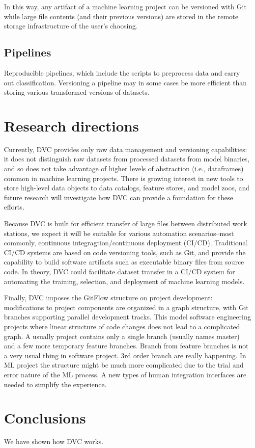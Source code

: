 \documentclass[10pt,sigconf, authordraft]{acmart}
\begin{document}
In this way, any artifact of a machine learning project can be versioned with Git while large file contents (and their previous versions) are stored in the remote storage infrastructure of the user's choosing. 

\subsection{Pipelines}


Reproducible pipelines, which include the scripts to preprocess data and carry out classification. Versioning a pipeline may in some cases be more efficient than storing various transformed versions of datasets. 


\section{Research directions}
Currently, DVC provides only raw data management and versioning capabilities: it does not distinguish raw datasets from processed datasets from model binaries, and so does not take advantage of higher levels of abstraction (i.e., dataframes) common in machine learning projects. There is growing interest in new tools to store high-level data objects to data catalogs, feature stores, and model zoos, and future research will investigate how DVC can provide a foundation for these efforts. 

Because DVC is built for efficient transfer of large files between distributed work stations, we expect it will be suitable for various automation scenarios--most commonly, continuous integragtion/continuous deployment (CI/CD). Traditional CI/CD systems are based on code versioning tools, such as Git, and provide the capability to build software artifacts such as executable binary files from source code. In theory, DVC could facilitate dataset transfer in a CI/CD system for automating the training, selection, and deployment of machine learning models. 

Finally, DVC imposes the GitFlow structure on project development: modifications to project components are organized in a graph structure, with Git branches supporting parallel development tracks. This model  software engineering projects where linear structure of code changes does not lead to a complicated graph. A usually project contains only a single branch (usually names master) and a few more temporary feature branches. Branch from feature branches is not a very usual thing in software project. 3rd order branch are really happening. In ML project the structure might be much more complicated due to the trial and error nature of the ML process. A new types of human integration interfaces are needed to simplify the experience.

\section{Conclusions}
We have shown how DVC works.






\end{document}

